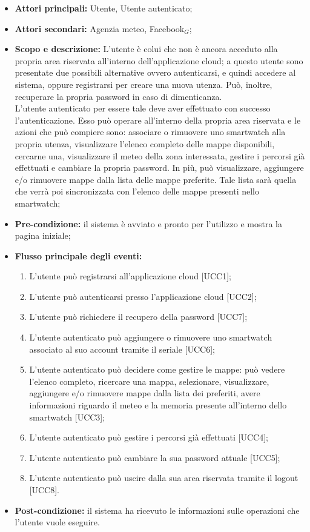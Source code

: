 \begin{itemize}
\item \textbf{Attori principali:} Utente, Utente autenticato;
\item \textbf{Attori secondari:} Agenzia meteo, Facebook$_{G}$;
\item \textbf{Scopo e descrizione:} L’utente è colui che non è ancora acceduto alla propria area riservata all’interno dell’applicazione cloud; a questo utente sono presentate due possibili alternative ovvero autenticarsi, e quindi accedere al sistema, oppure registrarsi per creare una nuova utenza. Può, inoltre, recuperare la propria password in caso di dimenticanza.\\ 
L’utente autenticato per essere tale deve aver effettuato con successo l'autenticazione. Esso può operare all’interno della propria area riservata e le azioni che può compiere sono: associare o rimuovere uno smartwatch alla propria utenza, visualizzare l'elenco completo delle mappe disponibili, cercarne una, visualizzare il meteo della zona interessata, gestire i percorsi già effettuati e cambiare la propria password. In più, può visualizzare, aggiungere e/o rimuovere mappe dalla lista delle mappe preferite. Tale lista sarà quella che verrà poi sincronizzata con l'elenco delle mappe presenti nello smartwatch;
\item \textbf{Pre-condizione:} il sistema è avviato e pronto per l'utilizzo e mostra la pagina iniziale; 
\item \textbf{Flusso principale degli eventi:} 
\begin{enumerate}
\item L’utente può registrarsi all’applicazione cloud [UCC1];
\item L’utente può autenticarsi presso l’applicazione cloud [UCC2];
\item L'utente può richiedere il recupero della password [UCC7];
\item L’utente autenticato può aggiungere o rimuovere uno smartwatch associato al suo account tramite il seriale [UCC6];
\item L’utente autenticato può decidere come gestire le mappe: può vedere l'elenco completo, ricercare una mappa, selezionare, visualizzare, aggiungere e/o rimuovere mappe dalla lista dei preferiti, avere informazioni riguardo il meteo e la memoria presente all'interno dello smartwatch [UCC3];
\item L’utente autenticato può gestire i percorsi già effettuati [UCC4];
\item L'utente autenticato può cambiare la sua password attuale [UCC5];
\item L'utente autenticato può uscire dalla sua area riservata tramite il logout [UCC8].
\end{enumerate}
\item \textbf{Post-condizione:} il sistema ha ricevuto le informazioni sulle operazioni che l’utente vuole eseguire.
\end{itemize}

